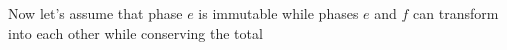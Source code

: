 Now let's assume that phase \(e\) is immutable while phases \(e\) and \(f\) can transform into each other while conserving the total 